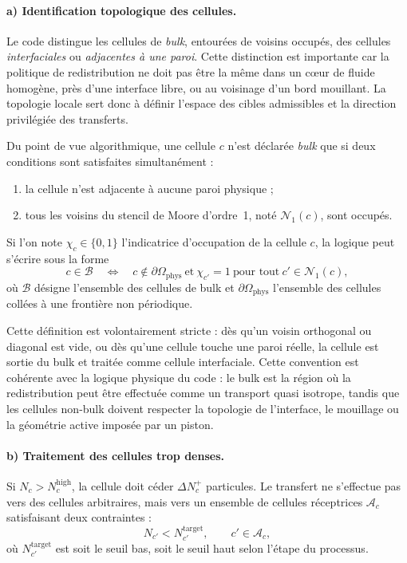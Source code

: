 \documentclass[11pt,a4paper]{article}
\begin{document}
\paragraph{a) Identification topologique des cellules.}
Le code distingue les cellules de \emph{bulk}, entourées de voisins occupés, des cellules \emph{interfaciales} ou \emph{adjacentes à une paroi}. Cette distinction est importante car la politique de redistribution ne doit pas être la même dans un cœur de fluide homogène, près d'une interface libre, ou au voisinage d'un bord mouillant. La topologie locale sert donc à définir l'espace des cibles admissibles et la direction privilégiée des transferts.

Du point de vue algorithmique, une cellule $c$ n'est déclarée \emph{bulk} que si deux conditions sont satisfaites simultanément :
\begin{enumerate}[label=(\roman*)]
  \item la cellule n'est adjacente à aucune paroi physique ;
  \item tous les voisins du stencil de Moore d'ordre~1, noté $\mathcal{N}_1(c)$, sont occupés.
\end{enumerate}
Si l'on note $\chi_c\in\{0,1\}$ l'indicatrice d'occupation de la cellule $c$, la logique peut s'écrire sous la forme
\begin{equation}
  c\in\mathcal{B}
  \quad \Longleftrightarrow \quad
  c\notin\partial\Omega_{\mathrm{phys}}
  \ \text{et}\ 
  \chi_{c'}=1 \ \text{pour tout}\ c'\in\mathcal{N}_1(c),
\end{equation}
où $\mathcal{B}$ désigne l'ensemble des cellules de bulk et $\partial\Omega_{\mathrm{phys}}$ l'ensemble des cellules collées à une frontière non périodique.

Cette définition est volontairement stricte : dès qu'un voisin orthogonal ou diagonal est vide, ou dès qu'une cellule touche une paroi réelle, la cellule est sortie du bulk et traitée comme cellule interfaciale. Cette convention est cohérente avec la logique physique du code : le bulk est la région où la redistribution peut être effectuée comme un transport quasi isotrope, tandis que les cellules non-bulk doivent respecter la topologie de l'interface, le mouillage ou la géométrie active imposée par un piston.

\paragraph{b) Traitement des cellules trop denses.}
Si $N_c > N_c^{\mathrm{high}}$, la cellule doit céder $\Delta N_c^{+}$ particules. Le transfert ne s'effectue pas vers des cellules arbitraires, mais vers un ensemble de cellules réceptrices $\mathcal{A}_c$ satisfaisant deux contraintes :
\begin{equation}
  N_{c'} < N_{c'}^{\mathrm{target}},
  \qquad c'\in\mathcal{A}_c,
\end{equation}
où $N_{c'}^{\mathrm{target}}$ est soit le seuil bas, soit le seuil haut selon l'étape du processus.
\end{document}
